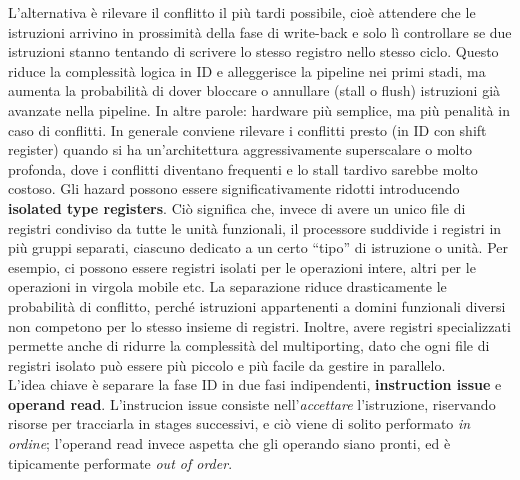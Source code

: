 L'alternativa è rilevare il conflitto il più tardi possibile, cioè attendere che le istruzioni arrivino in prossimità della fase di write-back e solo lì controllare se due istruzioni stanno tentando di scrivere lo stesso registro nello stesso ciclo. Questo riduce la complessità logica in ID e alleggerisce la pipeline nei primi stadi, ma aumenta la probabilità di dover bloccare o annullare (stall o flush) istruzioni già avanzate nella pipeline. In altre parole: hardware più semplice, ma più penalità in caso di conflitti.
In generale conviene rilevare i conflitti presto (in ID con shift register) quando si ha un'architettura aggressivamente superscalare o molto profonda, dove i conflitti diventano frequenti e lo stall tardivo sarebbe molto costoso.
Gli hazard possono essere significativamente ridotti introducendo \textbf{isolated type registers}. Ciò significa che, invece di avere un unico file di registri condiviso da tutte le unità funzionali, il processore suddivide i registri in più gruppi separati, ciascuno dedicato a un certo “tipo” di istruzione o unità. Per esempio, ci possono essere registri isolati per le operazioni intere, altri per le operazioni in virgola mobile etc. La separazione riduce drasticamente le probabilità di conflitto, perché istruzioni appartenenti a domini funzionali diversi non competono per lo stesso insieme di registri. Inoltre, avere registri specializzati permette anche di ridurre la complessità del multiporting, dato che ogni file di registri isolato può essere più piccolo e più facile da gestire in parallelo.
\\
L'idea chiave è separare la fase ID in due fasi indipendenti, \textbf{instruction issue} e \textbf{operand read}. L'instrucion issue consiste nell'\textit{accettare} l'istruzione, riservando risorse per tracciarla in stages successivi, e ciò viene di solito performato \textit{in ordine}; l'operand read invece aspetta che gli operando siano pronti, ed è tipicamente performate \textit{out of order}.

\begin{figure}[ht]
    \centering
    \setlength{\fboxrule}{0.5pt} %
    \setlength{\fboxsep}{0pt}    %
\end{figure}

